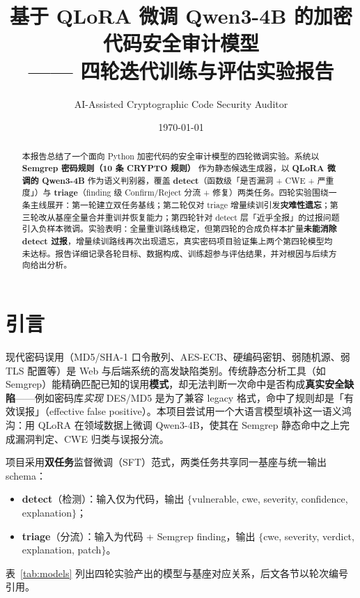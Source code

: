 \documentclass[UTF8,11pt]{ctexart}
\title{\bfseries 基于 QLoRA 微调 Qwen3-4B 的加密代码安全审计模型\\[0.4em] \large —— 四轮迭代训练与评估实验报告}
\author{AI-Assisted Cryptographic Code Security Auditor}
\date{\today}
\begin{document}
\maketitle
\vspace{-1.5em}

\begin{abstract}
\noindent 本报告总结了一个面向 Python 加密代码的安全审计模型的四轮微调实验。系统以 \textbf{Semgrep 密码规则（10 条 CRYPTO 规则）} 作为静态候选生成器，以 \textbf{QLoRA 微调的 Qwen3-4B} 作为语义判别器，覆盖 \textbf{detect}（函数级「是否漏洞 + CWE + 严重度」）与 \textbf{triage}（finding 级 Confirm/Reject 分流 + 修复）两类任务。四轮实验围绕一条主线展开：第一轮建立双任务基线；第二轮仅对 triage 增量续训引发\textbf{灾难性遗忘}；第三轮改从基座全量合并重训并恢复能力；第四轮针对 detect 层「近乎全报」的过报问题引入负样本微调。实验表明：全量重训路线稳定，但第四轮的合成负样本扩量\textbf{未能消除 detect 过报}，增量续训路线再次出现遗忘，真实密码项目验证集上两个第四轮模型均未达标。报告详细记录各轮目标、数据构成、训练超参与评估结果，并对根因与后续方向给出分析。
\end{abstract}

\tableofcontents

\section{引言}

现代密码误用（MD5/SHA-1 口令散列、AES-ECB、硬编码密钥、弱随机源、弱 TLS 配置等）是 Web 与后端系统的高发缺陷类别。传统静态分析工具（如 Semgrep）能精确匹配已知的误用\textbf{模式}，却无法判断一次命中是否构成\textbf{真实安全缺陷}——例如密码库\textit{实现} DES/MD5 是为了兼容 legacy 格式，命中了规则却是「有效误报」（effective false positive）。本项目尝试用一个大语言模型填补这一语义鸿沟：用 QLoRA 在领域数据上微调 Qwen3-4B，使其在 Semgrep 静态命中之上完成漏洞判定、CWE 归类与误报分流。

项目采用\textbf{双任务}监督微调（SFT）范式，两类任务共享同一基座与统一输出 schema：

\begin{itemize}
  \item \textbf{detect}（检测）：输入仅为代码，输出 $\{$vulnerable, cwe, severity, confidence, explanation$\}$；
  \item \textbf{triage}（分流）：输入为代码 + Semgrep finding，输出 $\{$cwe, severity, verdict, explanation, patch$\}$。
\end{itemize}

表~\ref{tab:models} 列出四轮实验产出的模型与基座对应关系，后文各节以轮次编号引用。
\end{document}
